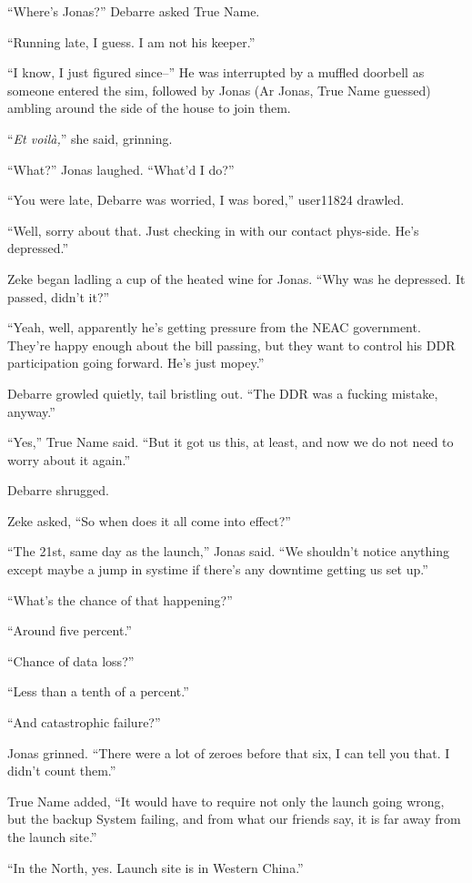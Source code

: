 ``Where's Jonas?'' Debarre asked True Name.

``Running late, I guess. I am not his keeper.''

``I know, I just figured since--'' He was interrupted by a muffled doorbell as someone entered the sim, followed by Jonas (Ar Jonas, True Name guessed) ambling around the side of the house to join them.

``\emph{Et voilà,}'' she said, grinning.

``What?'' Jonas laughed. ``What'd I do?''

``You were late, Debarre was worried, I was bored,'' user11824 drawled.

``Well, sorry about that. Just checking in with our contact phys-side. He's depressed.''

Zeke began ladling a cup of the heated wine for Jonas. ``Why was he depressed. It passed, didn't it?''

``Yeah, well, apparently he's getting pressure from the NEAC government. They're happy enough about the bill passing, but they want to control his DDR participation going forward. He's just mopey.''

Debarre growled quietly, tail bristling out. ``The DDR was a fucking mistake, anyway.''

``Yes,'' True Name said. ``But it got us this, at least, and now we do not need to worry about it again.''

Debarre shrugged.

Zeke asked, ``So when does it all come into effect?''

``The 21st, same day as the launch,'' Jonas said. ``We shouldn't notice anything except maybe a jump in systime if there's any downtime getting us set up.''

``What's the chance of that happening?''

``Around five percent.''

``Chance of data loss?''

``Less than a tenth of a percent.''

``And catastrophic failure?''

Jonas grinned. ``There were a lot of zeroes before that six, I can tell you that. I didn't count them.''

True Name added, ``It would have to require not only the launch going wrong, but the backup System failing, and from what our friends say, it is far away from the launch site.''

``In the North, yes. Launch site is in Western China.''

